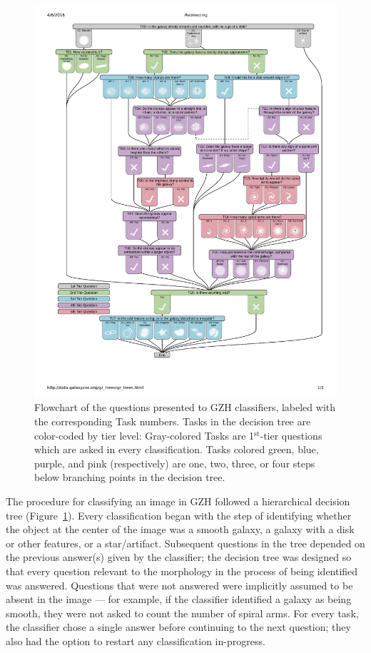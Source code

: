 \documentclass[twocolumn]{aastex6}
\begin{document}
\begin{figure}
\center
\includegraphics[width=\textwidth]{figures/gzh_decision_tree.pdf}
\caption{Flowchart of the questions presented to GZH classifiers, labeled with
the corresponding Task numbers. Tasks in the decision tree are color-coded by
tier level: Gray-colored Tasks are 1$^\mathrm{st}$-tier questions which are
asked in every classification. Tasks colored green, blue, purple, and pink
(respectively) are one, two, three, or four steps below branching points in the
decision tree.}
\label{fig:decisiontree}
\end{figure}

The procedure for classifying an image in GZH followed a hierarchical decision
tree (Figure~\ref{fig:decisiontree}). Every classification began with the step of
identifying whether the object at the center of the image was a smooth galaxy,
a galaxy with a disk or other features, or a star/artifact. Subsequent
questions in the tree depended on the previous answer(s) given by the classifier; the
decision tree was designed so that every question relevant to
the morphology in the process of being identified was answered. Questions that were not
answered were implicitly assumed to be absent in the image --- for example, if
the classifier identified a galaxy as being smooth, they were not asked to count the
number of spiral arms. For every task, the classifier chose a single answer before
continuing to the next question; they also had the option to restart any
classification in-progress. 
\end{document}
